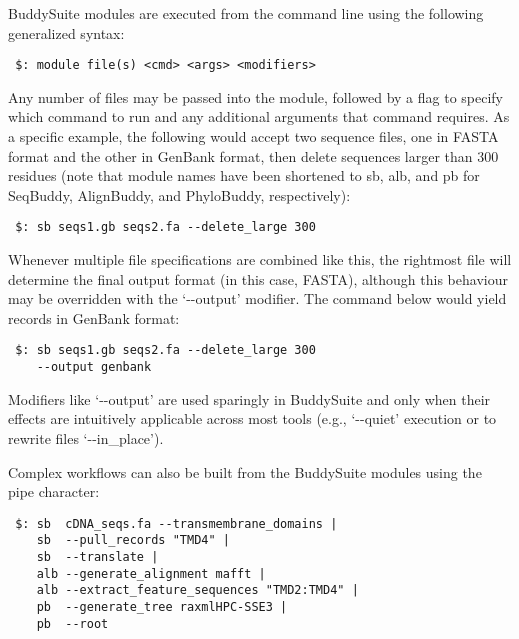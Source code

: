 \documentclass[nogrid]{MBE_article}%
\begin{document}
BuddySuite modules are executed from the command line using the following generalized syntax:

\smallskip

{\small
\begin{verbatim}
 $: module file(s) <cmd> <args> <modifiers>
\end{verbatim}
}
\smallskip

Any number of files may be passed into the module, followed by a flag to specify which command to run and any additional arguments that command requires. As a specific example, the following would accept two sequence files, one in FASTA format and the other in GenBank format, then delete sequences larger than 300 residues (note that module names have been shortened to sb, alb, and pb for SeqBuddy, AlignBuddy, and PhyloBuddy, respectively):

\smallskip

{\small
\begin{verbatim}
 $: sb seqs1.gb seqs2.fa --delete_large 300
\end{verbatim}
}
\smallskip

Whenever multiple file specifications are combined like this, the rightmost file will determine the final output format (in this case, FASTA), although this behaviour may be overridden with the `-{}-output' modifier. The command below would yield records in GenBank format:

\smallskip

{\small
\begin{verbatim}
 $: sb seqs1.gb seqs2.fa --delete_large 300
    --output genbank
\end{verbatim}
}
\smallskip

Modifiers like \mbox{`-{}-output'} are used sparingly in BuddySuite and only when their effects are intuitively applicable across most tools (e.g., \mbox{`-{}-quiet'} execution or to rewrite files \mbox{`-{}-in\_place'}).

Complex workflows can also be built from the BuddySuite modules using the pipe character:

\smallskip
{\small
\begin{verbatim}
 $: sb  cDNA_seqs.fa --transmembrane_domains |
    sb  --pull_records "TMD4" |
    sb  --translate |
    alb --generate_alignment mafft |
    alb --extract_feature_sequences "TMD2:TMD4" |
    pb  --generate_tree raxmlHPC-SSE3 |
    pb  --root
\end{verbatim}
}

\smallskip
\end{document}
